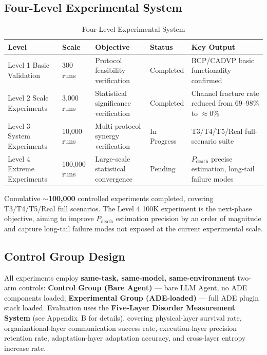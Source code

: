 \documentclass[11pt,a4paper]{article}
\begin{document}
\subsection{Four-Level Experimental System}
\label{sec:11.1}

\begin{table}[htbp]
\centering
\caption{Four-Level Experimental System}
\label{tab:experiment-levels}
\begin{tabular}{p{}p{}p{}p{}p{}}
\hline
\textbf{Level} & \textbf{Scale} & \textbf{Objective} & \textbf{Status} & \textbf{Key Output} \\
\hline
Level 1 Basic Validation & 300 runs & Protocol feasibility verification & Completed & BCP/CADVP basic functionality confirmed \\
Level 2 Scale Experiments & 3,000 runs & Statistical significance verification & Completed & Channel fracture rate reduced from 69--98\% to $\approx$0\% \\
Level 3 System Experiments & 10,000 runs & Multi-protocol synergy verification & In Progress & T3/T4/T5/Real full-scenario suite \\
Level 4 Extreme Experiments & 100,000 runs & Large-scale statistical convergence & Pending & $P_{\text{death}}$ precise estimation, long-tail failure modes \\
\hline
\end{tabular}
\end{table}

Cumulative \textbf{$\sim$100,000} controlled experiments completed, covering T3/T4/T5/Real full scenarios. The Level 4 100K experiment is the next-phase objective, aiming to improve $P_{\text{death}}$ estimation precision by an order of magnitude and capture long-tail failure modes not exposed at the current experimental scale.

\subsection{Control Group Design}
\label{sec:11.2}

All experiments employ \textbf{same-task, same-model, same-environment} two-arm controls:
\textbf{Control Group (Bare Agent)} --- bare LLM Agent, no ADE components loaded;
\textbf{Experimental Group (ADE-loaded)} --- full ADE plugin stack loaded.
Evaluation uses the \textbf{Five-Layer Disorder Measurement System} (see Appendix~B for details), covering physical-layer survival rate, organizational-layer communication success rate, execution-layer precision retention rate, adaptation-layer adaptation accuracy, and cross-layer entropy increase rate.
\end{document}
